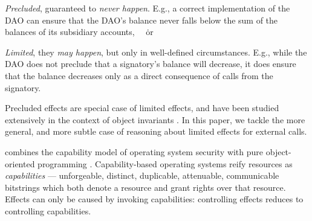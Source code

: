  \begin{customquote}
\emph{Precluded}, \ie  guaranteed to \emph{never happen}.
  E.g., a  correct  %
 implementation of the DAO  \cite{Dao} can ensure that  
 the DAO's balance  never falls below the sum of the balances of its subsidiary accounts, \ \ \. or


 \emph{Limited}, \ie  they  \emph{may happen}, but
 only in well-defined circumstances.
E.g., while the DAO does not preclude that a signatory's balance will decrease, it  does ensure that the balance decreases only
as a direct consequence of calls from the signatory.
 
 \end{customquote}
 
 
\noindent
Precluded effects are special case of limited effects,
and have been studied extensively in the context of object invariants   \cite{staticsfull,DrossoFrancaMuellerSummers08,BarDelFahLeiSch04,objInvars,MuellerPoetzsch-HeffterLeavens06}.
In this paper, we tackle the more general, %
and more subtle case of reasoning about limited effects for external calls.
 


 
 
combines the capability model
of operating system security \cite{levy:capabilities,CAP}
with pure object-oriented programming
\cite{selfpower,selfexp95,agha_actors_1987}.  Capability-based
operating systems reify resources
as \textit{capabilities} ---
unforgeable, distinct, duplicable, attenuable, communicable bitstrings
which both denote a resource and grant rights over that resource.
Effects can only be caused by invoking capabilities:
controlling effects reduces to controlling capabilities.


